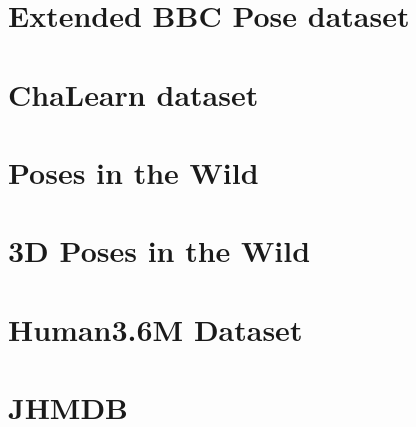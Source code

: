 \documentclass[a4paper]{report}
\begin{document}
\section*{Extended BBC Pose dataset}
\section*{ChaLearn dataset}
\section*{Poses in the Wild}
\section*{3D Poses in the Wild}
\section*{Human3.6M Dataset}
\section*{JHMDB}
\end{document}
